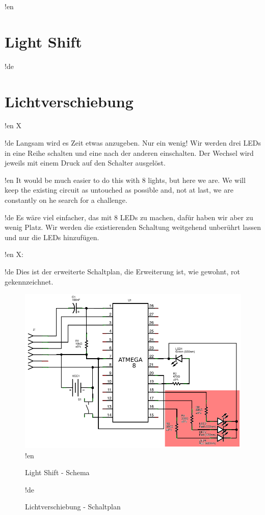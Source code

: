 !en \section{Light Shift}
!de \section{Lichtverschiebung}

!en X

!de Langsam wird es Zeit etwas anzugeben. Nur ein wenig! Wir werden drei LEDs in eine Reihe schalten und eine nach der anderen einschalten. Der Wechsel wird jeweils mit einem Druck auf den Schalter ausgelöst.



!en It would be much easier to do this with 8 lights, but here we are. We will keep the existing circuit as untouched as possible and, not at last, we are constantly on he search for a challenge.

!de Es wäre viel einfacher, das mit 8 LEDs zu machen, dafür haben wir aber zu wenig Platz. Wir werden die existierenden Schaltung weitgehend unberührt lassen und nur die LEDs hinzufügen.


!en X:

!de Dies ist der erweiterte Schaltplan, die Erweiterung ist, wie gewohnt, rot gekennzeichnet.

\begin{figure}[htbp]
  \centering
  \includegraphics[width=120mm]{LED/S010_light-shift/schema_circuit.png}
!en   \caption{Light Shift - Schema}
!de   \caption{Lichtverschiebung - Schaltplan}
  \label{atmega8-light-shift-schema}
\end{figure}




